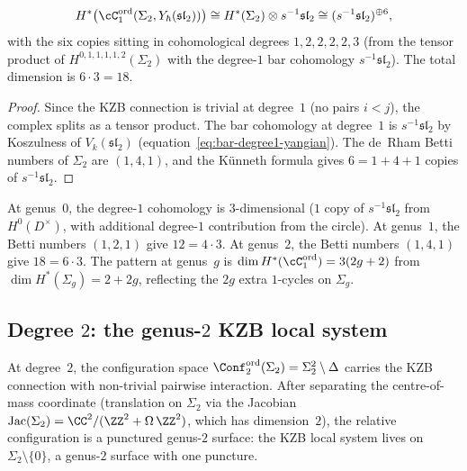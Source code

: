 \begin{proposition}
\label{prop:g2-degree1}
\begin{equation}\label{eq:g2-degree1-result}
  H^*\bigl(\cC_1^{\mathrm{ord}}(\Sigma_2,
  Y_\hbar(\mathfrak{sl}_2))\bigr)
  \cong H^*(\Sigma_2) \otimes s^{-1}\mathfrak{sl}_2
  \cong (s^{-1}\mathfrak{sl}_2)^{\oplus 6},
\end{equation}
with the six copies sitting in cohomological degrees
$1, 2, 2, 2, 2, 3$ \textup{(}from the tensor product of
$H^{0,1,1,1,1,2}(\Sigma_2)$ with the degree-$1$ bar
cohomology $s^{-1}\mathfrak{sl}_2$\textup{)}.
The total dimension is $6 \cdot 3 = 18$.
\end{proposition}

\begin{proof}
Since the KZB connection is trivial at degree~$1$
(no pairs $i < j$), the complex splits as a tensor
product. The bar cohomology at degree~$1$ is
$s^{-1}\mathfrak{sl}_2$ by
Koszulness of $V_k(\mathfrak{sl}_2)$
(equation~\eqref{eq:bar-degree1-yangian}). The de~Rham
Betti numbers of $\Sigma_2$ are $(1, 4, 1)$, and
the K\"unneth formula gives $6 = 1 + 4 + 1$ copies of
$s^{-1}\mathfrak{sl}_2$.
\end{proof}

\begin{remark}
At genus~$0$, the degree-$1$ cohomology is
$3$-dimensional ($1$ copy of $s^{-1}\mathfrak{sl}_2$
from $H^0(D^\times)$, with additional degree-$1$
contribution from the circle). At genus~$1$, the Betti
numbers $(1,2,1)$ give $12 = 4 \cdot 3$. At genus~$2$,
the Betti numbers $(1,4,1)$ give $18 = 6 \cdot 3$. The
pattern at genus~$g$ is
$\dim H^*(\cC_1^{\mathrm{ord}}) = 3(2g + 2)$ from
$\dim H^*(\Sigma_g) = 2 + 2g$, reflecting the $2g$
extra $1$-cycles on $\Sigma_g$.
\end{remark}

\subsection{Degree $2$: the genus-$2$ KZB local system}
\label{subsec:g2-degree2}

At degree~$2$, the configuration space
$\Conf_2^{\mathrm{ord}}(\Sigma_2) = \Sigma_2^2 \setminus
\Delta$ carries the KZB connection with non-trivial
pairwise interaction. After separating the
centre-of-mass coordinate (translation on $\Sigma_2$ via
the Jacobian $\mathrm{Jac}(\Sigma_2) =
\CC^2/(\ZZ^2 + \Omega\,\ZZ^2)$, which has dimension~$2$),
the relative configuration is a punctured
genus-$2$ surface:
the KZB local system lives on $\Sigma_2 \setminus \{0\}$,
a genus-$2$ surface with one puncture.

